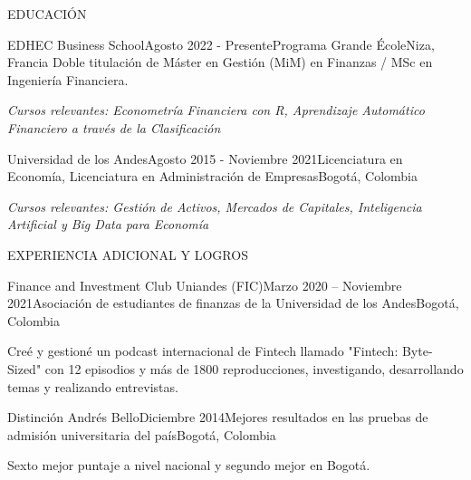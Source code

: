 \documentclass{resume} %
\begin{document}
\vspace{0.5em}

%
%

\begin{rSection}{EDUCACIÓN}

\vspace{0.3em}
\begin{rSubsection}{EDHEC Business School}{Agosto 2022 - Presente}{Programa Grande École}{Niza, Francia}
    Doble titulación de Máster en Gestión (MiM) en Finanzas / MSc en Ingeniería Financiera.
    \item \textit{Cursos relevantes: Econometría Financiera con R, Aprendizaje Automático Financiero a través de la Clasificación}
\end{rSubsection}

\begin{rSubsection}{Universidad de los Andes}{Agosto 2015 - Noviembre 2021}{Licenciatura en Economía, Licenciatura en Administración de Empresas}{Bogotá, Colombia}
    \item \textit{Cursos relevantes: Gestión de Activos, Mercados de Capitales, Inteligencia Artificial y Big Data para Economía}
\end{rSubsection}

\end{rSection}

\vspace{0.5em}


%
%

\begin{rSection}{EXPERIENCIA ADICIONAL Y LOGROS}

\vspace{0.3em}
\begin{rSubsection}{Finance and Investment Club Uniandes (FIC)}{Marzo 2020 – Noviembre 2021}{Asociación de estudiantes de finanzas de la Universidad de los Andes}{Bogotá, Colombia}
    \item Creé y gestioné un podcast internacional de Fintech llamado "Fintech: Byte-Sized" con 12 episodios y más de 1800 reproducciones, investigando, desarrollando temas y realizando entrevistas.
\end{rSubsection}

\begin{rSubsection}{Distinción Andrés Bello}{Diciembre 2014}{Mejores resultados en las pruebas de admisión universitaria del país}{Bogotá, Colombia}
    \item Sexto mejor puntaje a nivel nacional y segundo mejor en Bogotá.
\end{rSubsection}

\end{rSection}
\end{document}
